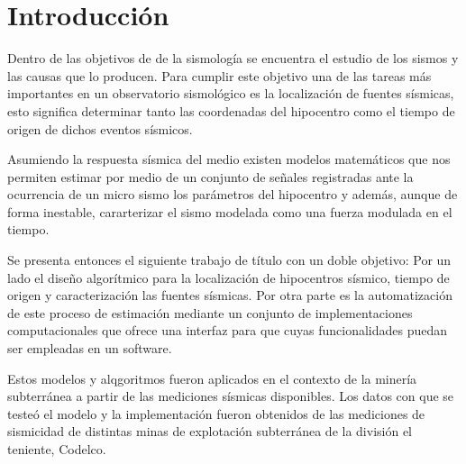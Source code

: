 


\chapter*{Introducción} 

Dentro de las objetivos de de la sismología se encuentra el estudio de los
sismos y las causas que lo producen. Para cumplir este objetivo una de las
tareas más importantes en un observatorio sismológico es la localización de
fuentes sísmicas, esto significa determinar tanto las coordenadas del hipocentro
como el tiempo de origen de dichos eventos sísmicos.

Asumiendo la respuesta sísmica del medio existen modelos matemáticos que nos
permiten estimar por medio de un conjunto de señales registradas ante la
ocurrencia de un micro sismo los parámetros del hipocentro y además, aunque de
forma inestable, cararterizar el sismo modelada como una fuerza modulada en el
tiempo.

Se presenta entonces el siguiente trabajo de título con un doble objetivo: Por
un lado el diseño algorítmico para la localización de hipocentros sísmico,
tiempo de origen y caracterización las fuentes sísmicas. Por otra parte es la
automatización de este proceso de estimación mediante un conjunto de
implementaciones computacionales que ofrece una interfaz para que cuyas
funcionalidades puedan ser empleadas en un software.

Estos modelos y alqgoritmos fueron aplicados en el contexto de la minería
subterránea a partir de las mediciones sísmicas disponibles. Los datos con que
se testeó el modelo y la implementación fueron obtenidos de las mediciones de
sismicidad de distintas minas de explotación subterránea de la división el
teniente, Codelco.

